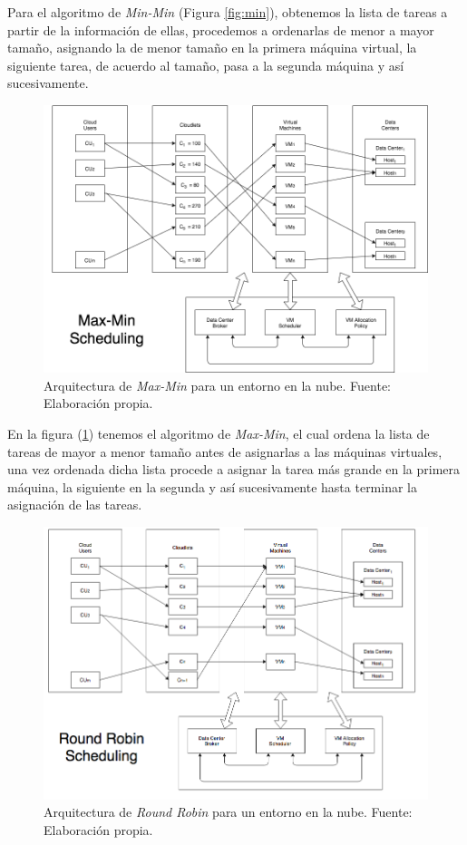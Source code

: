 Para el algoritmo de \textit{Min-Min} (Figura \ref{fig:min}), obtenemos la lista de tareas a partir de la informaci\'on de ellas, procedemos a ordenarlas de menor a mayor tama\~no, asignando la de menor tama\~no en la primera m\'aquina virtual, la siguiente tarea, de acuerdo al tama\~no, pasa a la segunda m\'aquina y as\'i sucesivamente.

\newpage
\setcounter{figure}{6}
\renewcommand\thefigure{\arabic{figure}}
\begin{figure}[h!]
	\centering
	\includegraphics[scale=0.5]{media/imagencuatro}
	\caption{Arquitectura de \textit{Max-Min} para un entorno en la nube. Fuente: Elaboraci\'on propia.}
	\label{fig:max}
\end{figure}

En la figura (\ref{fig:max}) tenemos el algoritmo de \textit{Max-Min}, el cual ordena la lista de tareas de mayor a menor tama\~no antes de asignarlas a las m\'aquinas virtuales, una vez ordenada dicha lista procede a asignar la tarea m\'as grande en la primera m\'aquina, la siguiente en la segunda y as\'i sucesivamente hasta terminar la asignaci\'on de las tareas.

\newpage
\renewcommand\thefigure{\arabic{figure}}
\begin{figure}[h!]
	\centering
	\includegraphics[scale=0.4]{media/RRAlgorithm}
	\caption{Arquitectura de \textit{Round Robin} para un entorno en la nube. Fuente: Elaboración propia.}
	\label{fig:RRAlgorithm}
\end{figure}

